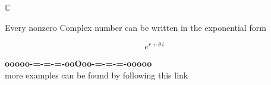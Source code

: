 \documentclass{ximera}
\begin{document}
\begin{theorem} \textbf{\textcolor{-red!75!green}{$\mathbb{C}$}} 


Every nonzero Complex number can be written in the exponential form 

\[ e^{r + \theta \, i} \]


\end{theorem}









































\begin{center}
\textbf{\textcolor{green!50!black}{ooooo-=-=-=-ooOoo-=-=-=-ooooo}} \\

more examples can be found by following this link\\ 

\end{center}
\end{document}
